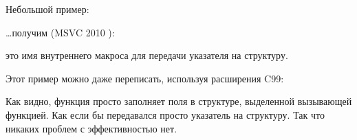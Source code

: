 Небольшой пример:



\dots получим (MSVC 2010 \Ox):



 это имя внутреннего макроса для передачи указателя на структуру.

Этот пример можно даже переписать, используя расширения C99:





Как видно, функция просто заполняет поля в структуре, выделенной вызывающей функцией. 
Как если бы передавался просто указатель на структуру.
Так что никаких проблем с эффективностью нет.

